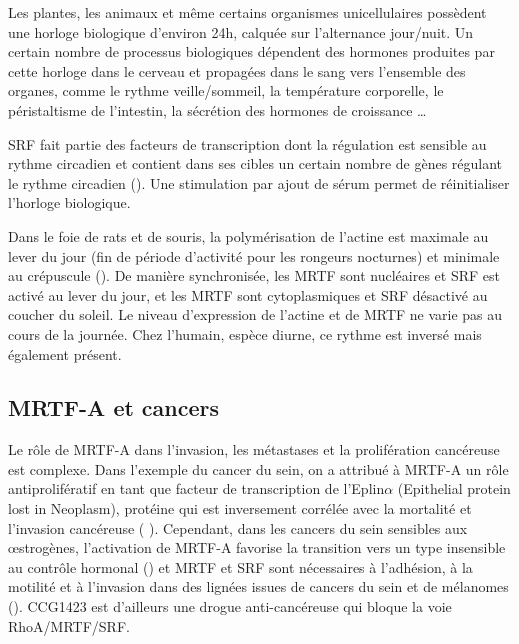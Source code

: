Les plantes, les animaux et même certains organismes unicellulaires possèdent une horloge biologique d'environ 24h, calquée sur l'alternance jour/nuit. Un certain nombre de processus biologiques dépendent des hormones produites par cette horloge dans le cerveau et propagées dans le sang vers l'ensemble des organes, comme le rythme veille/sommeil, la température corporelle, le péristaltisme de l'intestin, la sécrétion des hormones de croissance \dots 

SRF fait partie des facteurs de transcription dont la régulation est sensible au rythme circadien et contient dans ses cibles un certain nombre de gènes régulant le rythme circadien (\cite{esnault_rho-actin_2014}). Une stimulation par ajout de sérum permet de réinitialiser l'horloge biologique.

Dans le foie de rats et de souris, la polymérisation de l'actine est maximale au lever du jour (fin de période d'activité pour les rongeurs nocturnes) et minimale au crépuscule (\cite{gerber_blood-borne_2013}). De manière synchronisée, les MRTF sont nucléaires et SRF est activé au lever du jour, et les MRTF sont cytoplasmiques et SRF désactivé au coucher du soleil. Le niveau d'expression de l'actine et de MRTF ne varie pas au cours de la journée. Chez l'humain, espèce diurne, ce rythme est inversé mais également présent. 



\subsection{MRTF-A et cancers}
Le rôle de MRTF-A dans l'invasion, les métastases et la prolifération cancéreuse est complexe. 
Dans l'exemple du cancer du sein, on a attribué à MRTF-A un rôle antiprolifératif en tant que facteur de transcription de l'Eplin$\alpha$ (Epithelial protein lost in Neoplasm), protéine qui est inversement corrélée avec la mortalité et l'invasion cancéreuse ( \cite{leitner_epithelial_2010}).
Cependant, dans les cancers du sein sensibles aux \oe strogènes, l'activation de MRTF-A favorise la transition vers un type insensible au contrôle hormonal (\cite{kerdivel_activation_2014}) et MRTF et SRF sont nécessaires à l'adhésion, à la motilité et à l'invasion dans des lignées issues de cancers du sein et de mélanomes (\cite{medjkane_myocardin-related_2009}). CCG1423 est d'ailleurs une drogue anti-cancéreuse qui bloque la voie RhoA/MRTF/SRF. 
 

